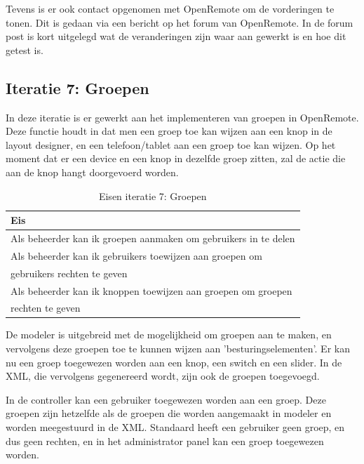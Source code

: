 \documentclass[]{article}
\begin{document}
Tevens is er ook contact opgenomen met OpenRemote om de vorderingen te tonen.
Dit is gedaan via een bericht op het forum van OpenRemote.  
In de forum post is kort uitgelegd wat de veranderingen zijn waar aan gewerkt is en hoe dit getest is. 
 
\newpage
\subsection{Iteratie 7: Groepen}

In deze iteratie is er gewerkt aan het implementeren van groepen in OpenRemote.
Deze functie houdt in dat men een groep toe kan wijzen aan een knop in de layout
designer, en een telefoon/tablet aan een groep toe kan wijzen. Op het moment dat er
een device en een knop in dezelfde groep zitten, zal de actie die aan de knop
hangt doorgevoerd worden.

\begin{table}[htpb]
  \caption{Eisen iteratie 7: Groepen}
  \begin{center}
    \begin{tabular}{|| l ||}\hline
        Eis                                                              \\\hline\hline
        Als beheerder kan ik groepen aanmaken om gebruikers in te delen  \\\hline
        Als beheerder kan ik gebruikers toewijzen aan groepen om         \\ 
        gebruikers rechten te geven                                      \\\hline
        Als beheerder kan ik knoppen toewijzen aan groepen om groepen    \\ 
        rechten te geven                                                 \\\hline
    \end{tabular}
  \end{center}
\end{table}

De modeler is uitgebreid met de mogelijkheid om groepen aan te maken, en
vervolgens deze groepen toe te kunnen wijzen aan 'besturingselementen'. Er kan
nu een groep toegewezen worden aan een knop, een switch en een slider. In de XML,
die vervolgens gegenereerd wordt, zijn ook de groepen toegevoegd. 

In de controller kan een gebruiker toegewezen worden aan een groep. Deze groepen
zijn hetzelfde als de groepen die worden aangemaakt in modeler en worden
meegestuurd in de XML. Standaard heeft een gebruiker geen groep, en dus geen
rechten, en in het administrator panel kan een groep toegewezen worden.
\end{document}
